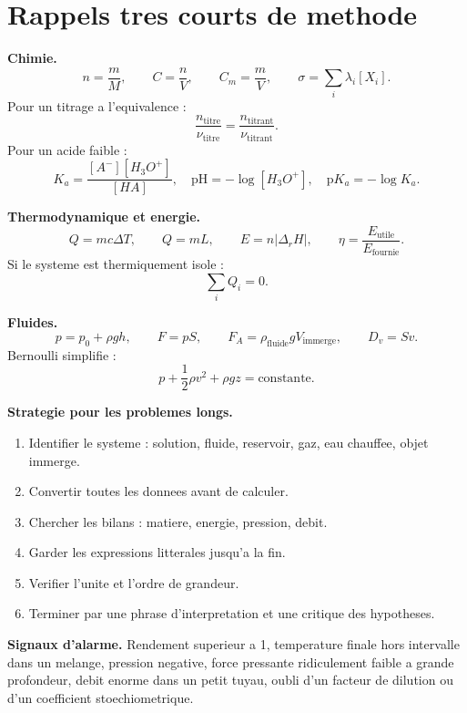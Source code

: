 \documentclass[11pt,a4paper]{article}
\newcommand{\pH}{\mathrm{pH}}
\newcommand{\pKa}{\mathrm{p}K_a}
\begin{document}

\section{Rappels tres courts de methode}

\begin{retenir}
\textbf{Chimie.}
\[
 n=\frac{m}{M},\qquad C=\frac{n}{V},\qquad C_m=\frac{m}{V},\qquad \sigma=\sum_i \lambda_i [X_i].
\]
Pour un titrage a l'equivalence :
\[
\frac{n_{\text{titre}}}{\nu_{\text{titre}}}=\frac{n_{\text{titrant}}}{\nu_{\text{titrant}}}.
\]
Pour un acide faible :
\[
K_a=\frac{[A^-][H_3O^+]}{[HA]},\quad \pH=-\log[H_3O^+],\quad \pKa=-\log K_a.
\]
\end{retenir}

\begin{retenir}
\textbf{Thermodynamique et energie.}
\[
Q=mc\Delta T,\qquad Q=mL,\qquad E=n|\Delta_rH|,\qquad \eta=\frac{E_{\text{utile}}}{E_{\text{fournie}}}.
\]
Si le systeme est thermiquement isole :
\[
\sum_i Q_i=0.
\]
\end{retenir}

\begin{retenir}
\textbf{Fluides.}
\[
p=p_0+\rho gh,\qquad F=pS,\qquad F_A=\rho_{\text{fluide}}gV_{\text{immerge}},\qquad D_v=Sv.
\]
Bernoulli simplifie :
\[
p+\frac12\rho v^2+\rho gz=\text{constante}.
\]
\end{retenir}

\begin{methode}
\textbf{Strategie pour les problemes longs.}
\begin{enumerate}
\item Identifier le systeme : solution, fluide, reservoir, gaz, eau chauffee, objet immerge.
\item Convertir toutes les donnees avant de calculer.
\item Chercher les bilans : matiere, energie, pression, debit.
\item Garder les expressions litterales jusqu'a la fin.
\item Verifier l'unite et l'ordre de grandeur.
\item Terminer par une phrase d'interpretation et une critique des hypotheses.
\end{enumerate}
\end{methode}

\begin{erreur}
\textbf{Signaux d'alarme.} Rendement superieur a 1, temperature finale hors intervalle dans un melange, pression negative, force pressante ridiculement faible a grande profondeur, debit enorme dans un petit tuyau, oubli d'un facteur de dilution ou d'un coefficient stoechiometrique.
\end{erreur}
\end{document}
